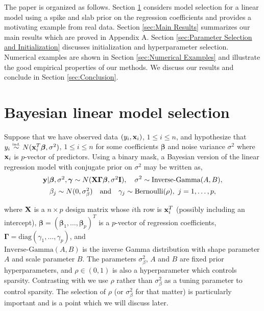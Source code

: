 \documentclass[11pt]{article}
\newtheorem{Main Result}{Main Result}
\def\vectorfontone{\bf}
\def\vectorfonttwo{\boldsymbol}
\def\vx{{\vectorfontone x}}                      %
\def\vy{{\vectorfontone y}}                      %
\def\vbeta{{\vectorfonttwo \beta}}               %
\def\vgamma{{\vectorfonttwo \gamma}}             %
\def\matrixfontone{\bf}
\def\matrixfonttwo{\boldsymbol}
\def\mI{{\matrixfontone I}}                      %
\def\mX{{\matrixfontone X}}                      %
\def\mGamma{{\matrixfonttwo \Gamma}}             %
\def\ds{\displaystyle}
\def\diag{\text{diag}}
\begin{document}
The paper is organized as follows. Section \ref{sec:Bayesian linear model selection}
considers model selection for a linear model using a spike and slab prior on the
regression coefficients and provides a motivating example from real data. Section
\ref{sec:Main Results} summarizes our main results which are proved in
Appendix A.
Section \ref{sec:Parameter Selection and Initialization}
discusses initialization and hyperparameter selection. Numerical examples are shown
in Section \ref{sec:Numerical Examples}  and illustrate the good empirical properties of
our methods. We discuss our results and conclude in Section \ref{sec:Conclusion}.

 
\section{Bayesian linear model selection}
\label{sec:Bayesian linear model selection}

Suppose that we have observed data $(y_i,\vx_i)$, $1\le i\le n$, and hypothesize
that $y_i \stackrel{\mbox{\tiny ind.}}{\sim} N(\vx_i^{T}\vbeta,\sigma^2)$,
$1\le i\le n$ for some coefficients $\vbeta$ and noise variance $\sigma^2$
where $\vx_i$ is $p$-vector of predictors. 
Using a binary mask, a Bayesian version of the linear regression
model with conjugate prior on $\sigma^2$ may be written as,
\begin{equation}\label{eq:binaryMask}
\begin{array}{c}
\vy|\vbeta,\sigma^2,\vgamma \sim N(\mX\mGamma\vbeta,\sigma^2\mI), \quad
\ds \sigma^2 \ds \sim \mbox{Inverse-Gamma}(A,B), \\ [1ex]
\beta_j \sim N(0,\sigma_\beta^2)
\quad \mbox{and} \quad
\gamma_j \sim \mbox{Bernoulli}(\rho), \ j=1,\ldots,p,
\end{array}
\end{equation}

\noindent where $\mX$ is a $n\times p$ design matrix whose $i$th row is $\vx_i^{T}$
(possibly including an intercept), $\vbeta=(\vbeta_1,\ldots,\vbeta_p)^T$ is a $p$-vector of regression
coefficients, $\mGamma=\diag(\gamma_1,\ldots,\gamma_p)$, and\\
$\mbox{Inverse-Gamma}(A,B)$ is the inverse Gamma distribution with shape
parameter $A$ and scale parameter $B$. The parameters $\sigma^2_\beta$, $A$ and $B$ are fixed prior hyperparameters, and
$\rho\in(0,1)$ is also a hyperparameter which controls sparsity. Contrasting with \cite{Rockova2014}
we use $\rho$ rather than $\sigma_\beta^2$ as a tuning parameter to control sparsity. The selection
of $\rho$ (or $\sigma_\beta^2$ for that matter) is particularly important and is a point which we
will discuss later. 
\end{document}

